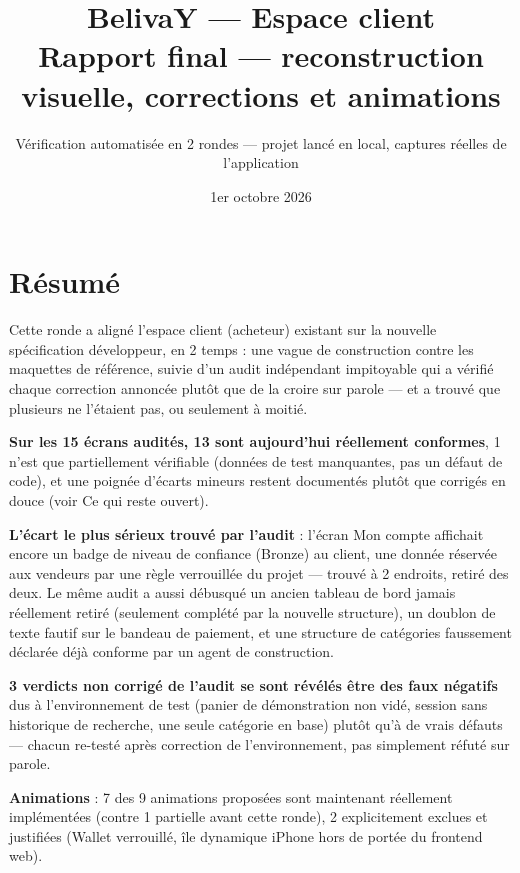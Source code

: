 \documentclass[11pt]{article}
\title{\textbf{\color{belivayorange} BelivaY — Espace client} \\[4pt] \large Rapport final — reconstruction visuelle, corrections et animations}
\author{Vérification automatisée en 2 rondes — projet lancé en local, captures réelles de l'application}
\date{1er octobre 2026}
\begin{document}
\maketitle

\section*{Résumé}
Cette ronde a aligné l'espace client (acheteur) existant sur la nouvelle spécification développeur, en 2 temps : une vague de construction contre les maquettes de référence, suivie d'un audit indépendant \og impitoyable\fg{} qui a vérifié chaque correction annoncée plutôt que de la croire sur parole — et a trouvé que plusieurs ne l'étaient pas, ou seulement à moitié.

\textbf{Sur les 15 écrans audités, 13 sont aujourd'hui réellement conformes}, 1 n'est que partiellement vérifiable (données de test manquantes, pas un défaut de code), et une poignée d'écarts mineurs restent documentés plutôt que corrigés en douce (voir \og Ce qui reste ouvert\fg{}).

\textbf{L'écart le plus sérieux trouvé par l'audit} : l'écran \og Mon compte\fg{} affichait encore un badge de niveau de confiance (\og Bronze\fg{}) au client, une donnée réservée aux vendeurs par une règle verrouillée du projet — trouvé à 2 endroits, retiré des deux. Le même audit a aussi débusqué un ancien tableau de bord jamais réellement retiré (seulement complété par la nouvelle structure), un doublon de texte fautif sur le bandeau de paiement, et une structure de catégories faussement déclarée \og déjà conforme\fg{} par un agent de construction.

\textbf{3 verdicts \og non corrigé\fg{} de l'audit se sont révélés être des faux négatifs} dus à l'environnement de test (panier de démonstration non vidé, session sans historique de recherche, une seule catégorie en base) plutôt qu'à de vrais défauts — chacun re-testé après correction de l'environnement, pas simplement réfuté sur parole.

\textbf{Animations} : 7 des 9 animations proposées sont maintenant réellement implémentées (contre 1 partielle avant cette ronde), 2 explicitement exclues et justifiées (Wallet verrouillé, île dynamique iPhone hors de portée du frontend web).
\end{document}
